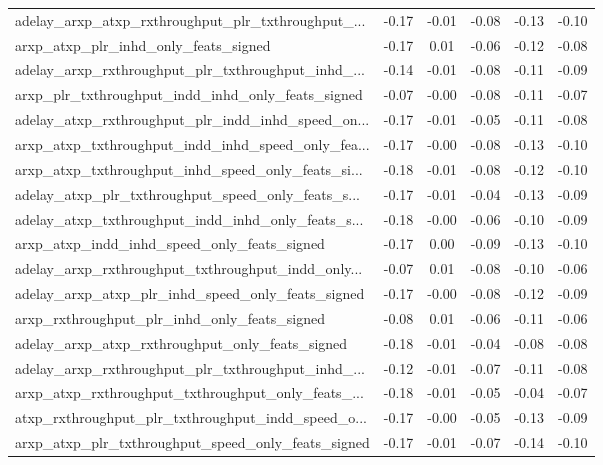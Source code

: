 \begin{tabular}{|l|*{4}{c}|r|}
adelay\_arxp\_atxp\_rxthroughput\_plr\_txthroughput\_... & -0.17 & -0.01 &   -0.08 &      -0.13 & -0.10 \\
arxp\_atxp\_plr\_inhd\_only\_feats\_signed               & -0.17 &  0.01 &   -0.06 &      -0.12 & -0.08 \\
adelay\_arxp\_rxthroughput\_plr\_txthroughput\_inhd\_... & -0.14 & -0.01 &   -0.08 &      -0.11 & -0.09 \\
arxp\_plr\_txthroughput\_indd\_inhd\_only\_feats\_signed  & -0.07 & -0.00 &   -0.08 &      -0.11 & -0.07 \\
adelay\_atxp\_rxthroughput\_plr\_indd\_inhd\_speed\_on... & -0.17 & -0.01 &   -0.05 &      -0.11 & -0.08 \\
arxp\_atxp\_txthroughput\_indd\_inhd\_speed\_only\_fea... & -0.17 & -0.00 &   -0.08 &      -0.13 & -0.10 \\
arxp\_atxp\_txthroughput\_inhd\_speed\_only\_feats\_si... & -0.18 & -0.01 &   -0.08 &      -0.12 & -0.10 \\
adelay\_atxp\_plr\_txthroughput\_speed\_only\_feats\_s... & -0.17 & -0.01 &   -0.04 &      -0.13 & -0.09 \\
adelay\_atxp\_txthroughput\_indd\_inhd\_only\_feats\_s... & -0.18 & -0.00 &   -0.06 &      -0.10 & -0.09 \\
arxp\_atxp\_indd\_inhd\_speed\_only\_feats\_signed        & -0.17 &  0.00 &   -0.09 &      -0.13 & -0.10 \\
adelay\_arxp\_rxthroughput\_txthroughput\_indd\_only... & -0.07 &  0.01 &   -0.08 &      -0.10 & -0.06 \\
adelay\_arxp\_atxp\_plr\_inhd\_speed\_only\_feats\_signed  & -0.17 & -0.00 &   -0.08 &      -0.12 & -0.09 \\
arxp\_rxthroughput\_plr\_inhd\_only\_feats\_signed       & -0.08 &  0.01 &   -0.06 &      -0.11 & -0.06 \\
adelay\_arxp\_atxp\_rxthroughput\_only\_feats\_signed    & -0.18 & -0.01 &   -0.04 &      -0.08 & -0.08 \\
adelay\_arxp\_rxthroughput\_plr\_txthroughput\_inhd\_... & -0.12 & -0.01 &   -0.07 &      -0.11 & -0.08 \\
arxp\_atxp\_rxthroughput\_txthroughput\_only\_feats\_... & -0.18 & -0.01 &   -0.05 &      -0.04 & -0.07 \\
atxp\_rxthroughput\_plr\_txthroughput\_indd\_speed\_o... & -0.17 & -0.00 &   -0.05 &      -0.13 & -0.09 \\
arxp\_atxp\_plr\_txthroughput\_speed\_only\_feats\_signed & -0.17 & -0.01 &   -0.07 &      -0.14 & -0.10 \\

\end{tabular}
